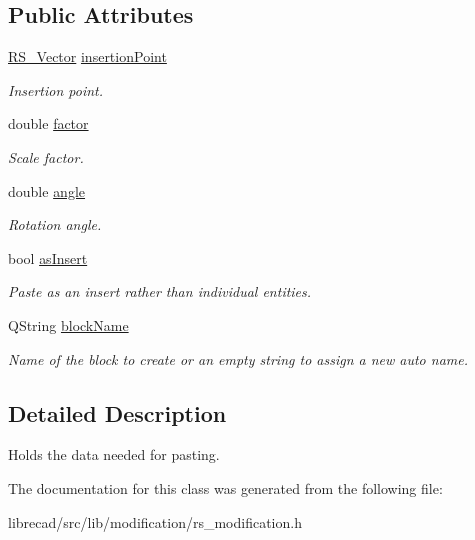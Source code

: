 \subsection*{Public Attributes}
\begin{DoxyCompactItemize}
\item 
\hypertarget{classRS__PasteData_ae979331a3fbb6db929d764106a64023c}{\hyperlink{classRS__Vector}{R\-S\-\_\-\-Vector} \hyperlink{classRS__PasteData_ae979331a3fbb6db929d764106a64023c}{insertion\-Point}}\label{classRS__PasteData_ae979331a3fbb6db929d764106a64023c}

\begin{DoxyCompactList}\small\item\em Insertion point. \end{DoxyCompactList}\item 
\hypertarget{classRS__PasteData_a2b49b40f1313e982e1f3e56acd8d9cc3}{double \hyperlink{classRS__PasteData_a2b49b40f1313e982e1f3e56acd8d9cc3}{factor}}\label{classRS__PasteData_a2b49b40f1313e982e1f3e56acd8d9cc3}

\begin{DoxyCompactList}\small\item\em Scale factor. \end{DoxyCompactList}\item 
\hypertarget{classRS__PasteData_ac28460107d1902d713979277887b482d}{double \hyperlink{classRS__PasteData_ac28460107d1902d713979277887b482d}{angle}}\label{classRS__PasteData_ac28460107d1902d713979277887b482d}

\begin{DoxyCompactList}\small\item\em Rotation angle. \end{DoxyCompactList}\item 
\hypertarget{classRS__PasteData_a631f78a509532db1c214321381ccf443}{bool \hyperlink{classRS__PasteData_a631f78a509532db1c214321381ccf443}{as\-Insert}}\label{classRS__PasteData_a631f78a509532db1c214321381ccf443}

\begin{DoxyCompactList}\small\item\em Paste as an insert rather than individual entities. \end{DoxyCompactList}\item 
\hypertarget{classRS__PasteData_aefa5f620da17ef80f4a695d3934f2558}{Q\-String \hyperlink{classRS__PasteData_aefa5f620da17ef80f4a695d3934f2558}{block\-Name}}\label{classRS__PasteData_aefa5f620da17ef80f4a695d3934f2558}

\begin{DoxyCompactList}\small\item\em Name of the block to create or an empty string to assign a new auto name. \end{DoxyCompactList}\end{DoxyCompactItemize}


\subsection{Detailed Description}
Holds the data needed for pasting. 

The documentation for this class was generated from the following file\-:\begin{DoxyCompactItemize}
\item 
librecad/src/lib/modification/rs\-\_\-modification.\-h\end{DoxyCompactItemize}
